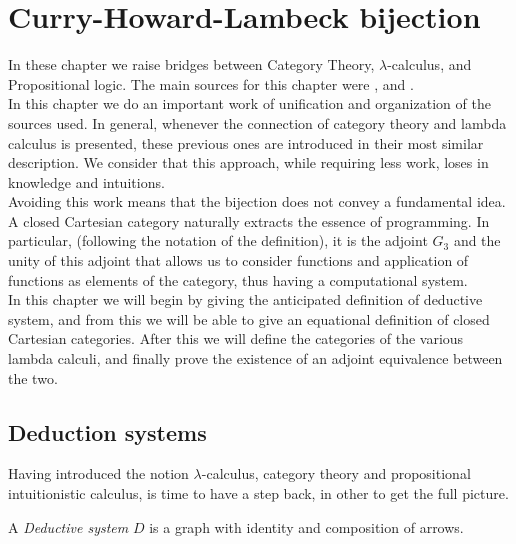 
\chapter{Curry-Howard-Lambeck bijection}
\thispagestyle{empty}
In these chapter we raise bridges between Category Theory, $\lambda$-calculus, and Propositional logic. The main sources for this chapter were  \cite{lambek1988introduction}, \cite{lambek1985cartesian} and \cite[Chapter 6]{selinger2008lecture}.\\

In this chapter we do an important work of unification and organization of the sources used. In general, whenever the connection of category theory and lambda calculus is presented, these previous ones are introduced in their most similar description. We consider that this approach, while requiring less work, loses in knowledge and intuitions.\\


 Avoiding this work means that the bijection does not convey a fundamental idea. A closed Cartesian category naturally extracts the essence of programming. In particular, (following the notation of the definition), it is the adjoint $G_3$ and the unity of this adjoint that allows us to consider functions and application of functions as elements of the category, thus having a computational system.\\

In this chapter we will begin by giving the anticipated definition of deductive system, and from this we will be able to give an equational definition of closed Cartesian categories.  After this we will define the categories of the various lambda calculi, and finally prove the existence of an adjoint equivalence between the two.\\



\section{Deduction systems}
Having introduced the notion $\lambda$-calculus, category theory and propositional intuitionistic calculus, is time to have a step back, in other to get the full picture.

\begin{definition}
  A \emph{Deductive system} $D$ is a graph  with identity and composition of arrows.
\end{definition}


